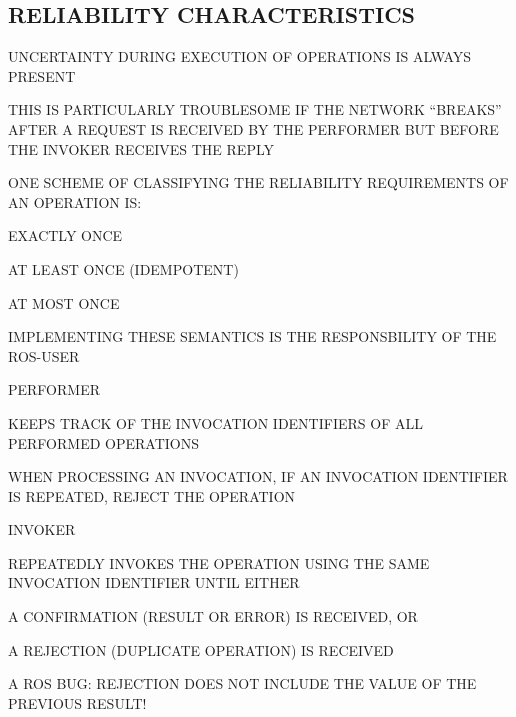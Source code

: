 \begin{bwslide}
\part*	{RELIABILITY CHARACTERISTICS}\bf

\begin{nrtc}
\item	UNCERTAINTY DURING EXECUTION OF OPERATIONS IS ALWAYS PRESENT

\item	THIS IS PARTICULARLY TROUBLESOME IF THE NETWORK ``BREAKS''
	AFTER A REQUEST IS RECEIVED BY THE PERFORMER BUT BEFORE
	THE INVOKER RECEIVES THE REPLY

\item	ONE SCHEME OF CLASSIFYING THE RELIABILITY REQUIREMENTS OF AN OPERATION
	IS:
    \begin{nrtc}
    \item	EXACTLY ONCE

    \item	AT LEAST ONCE (IDEMPOTENT)

    \item	AT MOST ONCE
    \end{nrtc}

\item	IMPLEMENTING THESE SEMANTICS IS THE RESPONSBILITY OF THE ROS-USER
\end{nrtc}
\end{bwslide}


\begin{bwslide}

\begin{nrtc}
\item	PERFORMER
    \begin{nrtc}
    \item	KEEPS TRACK OF THE INVOCATION IDENTIFIERS OF ALL PERFORMED
		OPERATIONS

    \item	WHEN PROCESSING AN INVOCATION, IF AN INVOCATION IDENTIFIER IS
		REPEATED, REJECT THE OPERATION 
    \end{nrtc}

\item	INVOKER
    \begin{nrtc}
    \item	REPEATEDLY INVOKES THE OPERATION USING THE SAME INVOCATION
		IDENTIFIER UNTIL EITHER

    \item	A CONFIRMATION (RESULT OR ERROR) IS RECEIVED, OR

    \item	A REJECTION (DUPLICATE OPERATION) IS RECEIVED
    \end{nrtc}

\item	A ROS BUG: REJECTION DOES NOT INCLUDE THE VALUE OF THE PREVIOUS RESULT!
\end{nrtc}
\end{bwslide}


